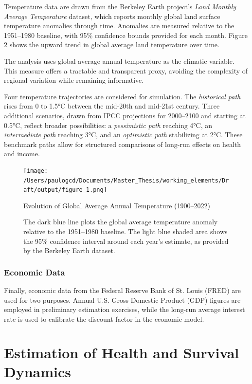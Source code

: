 \documentclass{article}
\begin{document}
Temperature data are drawn from the Berkeley Earth project’s \textit{Land Monthly Average Temperature} dataset, which reports monthly global land surface temperature anomalies through time.
Anomalies are measured relative to the 1951–1980 baseline, with 95\% confidence bounds provided for each month.
Figure 2 shows the upward trend in global average land temperature over time.

The analysis uses global average annual temperature as the climatic variable.
This measure offers a tractable and transparent proxy, avoiding the complexity of regional variation while remaining informative.

Four temperature trajectories are considered for simulation.
The \textit{historical path} rises from 0 to 1.5°C between the mid-20th and mid-21st century. Three additional scenarios, drawn from IPCC projections for 2000–2100 and starting at 0.5°C, reflect broader possibilities: a \textit{pessimistic path} reaching 4°C, an \textit{intermediate path} reaching 3°C, and an \textit{optimistic path} stabilizing at 2°C.
These benchmark paths allow for structured comparisons of long-run effects on health and income.

\begin{figure}[H]
    \centering
    \texttt{[image: /Users/paulogcd/Documents/Master\_Thesis/working\_elements/Draft/output/figure\_1.png]}
    \caption{Evolution of Global Average Annual Temperature (1900–2022)}
    \caption*{\small The dark blue line plots the global average temperature anomaly relative to the 1951–1980 baseline.
    The light blue shaded area shows the 95\% confidence interval around each year’s estimate, as provided by the Berkeley Earth dataset.}
\end{figure}

\subsubsection{Economic Data}

Finally, economic data from the Federal Reserve Bank of St. Louis (FRED) are used for two purposes. 
Annual U.S. Gross Domestic Product (GDP) figures are employed in preliminary estimation exercises, 
while the long-run average interest rate is used to calibrate the discount factor in the economic model.

\section{Estimation of Health and Survival Dynamics}
\end{document}
